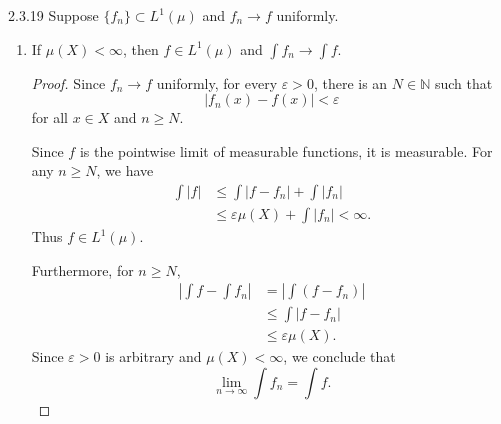 \documentclass[11pt]{article}
\begin{document}
\begin{problem}{2.3.19}
  Suppose \( \{f_n\} \subset L^1(\mu) \) and \( f_n \rightarrow f \) uniformly.
  \begin{enumerate}[label=(\alph*)]
    \item If \( \mu(X) < \infty \), then \( f \in L^1(\mu) \) and \( \int f_n \rightarrow \int f \).
          \begin{proof}
            Since \( f_n \rightarrow f \) uniformly, for every \( \varepsilon > 0 \), there is an \( N \in \mathbb{N} \) such that
            \begin{equation}
              \label{eq:p1-uniform}
              |f_n(x)-f(x)| < \varepsilon
            \end{equation}
            for all \( x \in X \) and \( n \geq N \).

            Since \( f \) is the pointwise limit of measurable functions, it is measurable. For any \( n \geq N \), we have
            \begin{equation}
              \label{eq:p1-integrable}
              \begin{aligned}
                \int |f|
                &\leq \int |f-f_n| + \int |f_n| \\
                &\leq \varepsilon\mu(X) + \int |f_n| < \infty.
              \end{aligned}
            \end{equation}
            Thus \( f \in L^1(\mu) \).

            Furthermore, for \( n \geq N \),
            \begin{equation}
              \label{eq:p1-convergence}
              \begin{aligned}
                \left|\int f-\int f_n\right|
                &= \left|\int(f-f_n)\right| \\
                &\leq \int|f-f_n| \\
                &\leq \varepsilon\mu(X).
              \end{aligned}
            \end{equation}
            Since \( \varepsilon > 0 \) is arbitrary and \( \mu(X) < \infty \), we conclude that
            \begin{equation}
              \label{eq:p1-conclusion}
              \lim_{n\to\infty}\int f_n=\int f.
            \end{equation}
          \end{proof}


\end{enumerate}
\end{problem}
\end{document}
